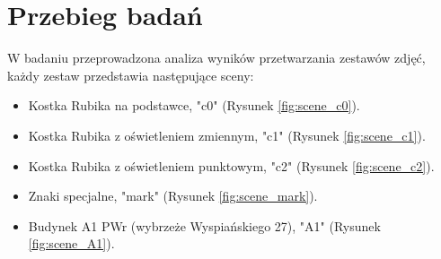 \graphicspath{ {./img/data/} }

\chapter{Przebieg badań}

W badaniu przeprowadzona analiza wyników przetwarzania zestawów zdjęć, każdy zestaw przedstawia następujące sceny:
\begin{itemize}
   \item Kostka Rubika na podstawce, "c0" (Rysunek \ref{fig:scene_c0}).
   \item Kostka Rubika z oświetleniem zmiennym, "c1" (Rysunek \ref{fig:scene_c1}).
   \item Kostka Rubika z oświetleniem punktowym, "c2" (Rysunek \ref{fig:scene_c2}).
   \item Znaki specjalne, "mark" (Rysunek \ref{fig:scene_mark}).
   \item Budynek A1 PWr (wybrzeże Wyspiańskiego 27), "A1" (Rysunek \ref{fig:scene_A1}).
\end{itemize}

